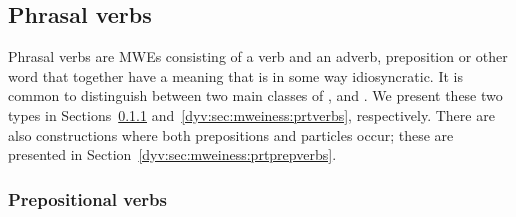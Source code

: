 \documentclass[output=paper]{langsci/langscibook}
\begin{document}
  
\subsection{Phrasal verbs}\label{dyv:sec:mweiness:phrasal}

Phrasal verbs are MWEs consisting of a verb and an adverb, preposition or other word that together have a meaning that is in some way idiosyncratic.
It is common to distinguish between two main classes of ,  and .
We present these two types in Sections~\ref{dyv:sec:mweiness:prepverbs} and~\ref{dyv:sec:mweiness:prtverbs}, respectively.
There are also constructions where both prepositions and particles occur; these are presented in Section~\ref{dyv:sec:mweiness:prtprepverbs}.

\subsubsection{Prepositional verbs}\label{dyv:sec:mweiness:prepverbs}
\end{document}

